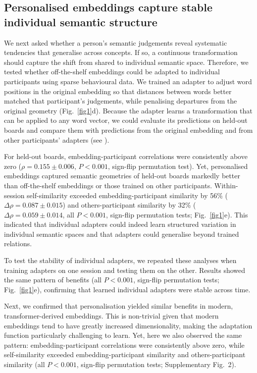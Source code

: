 \documentclass[pdflatex,sn-mathphys]{sn-jnl}
\begin{document}
\subsection{Personalised embeddings capture stable individual semantic structure}
We next asked whether a person's semantic judgements reveal systematic tendencies that generalise across concepts. If so, a continuous transformation should capture the shift from shared to individual semantic space. Therefore, we tested whether off-the-shelf embeddings could be adapted to individual participants using sparse behavioural data. We trained an adapter to adjust word positions in the original embedding so that distances between words better matched that participant's judgements, while penalising departures from the original geometry (Fig.~\ref{fig1}d). Because the adapter learns a transformation that can be applied to any word vector, we could evaluate its predictions on held-out boards and compare them with predictions from the original embedding and from other participants' adapters (see ).

For held-out boards, embedding-participant correlations were consistently above zero ($\rho = 0.155\pm0.006$, $P < 0.001$, sign-flip permutation test). Yet, personalised embeddings captured semantic geometries of held-out boards markedly better than off-the-shelf embeddings or those trained on other participants. Within-session self-similarity exceeded embedding-participant similarity by 56\% ($\Delta\rho = 0.087\pm0.015$) and others-participant similarity by 32\% ($\Delta\rho = 0.059\pm0.014$, all $P < 0.001$, sign-flip permutation tests; Fig.~\ref{fig1}e). This indicated that individual adapters could indeed learn structured variation in individual semantic spaces and that adapters could generalise beyond trained relations. 

To test the stability of individual adapters, we repeated these analyses when training adapters on one session and testing them on the other. Results showed the same pattern of benefits (all $P < 0.001$, sign-flip permutation tests; Fig.~\ref{fig1}e), confirming that learned individual adapters were stable across time.

Next, we confirmed that personalisation yielded similar benefits in modern, transformer-derived embeddings. This is non-trivial given that modern embeddings tend to have greatly increased dimensionality, making the adaptation function particularly challenging to learn. Yet, here we also observed the same pattern: embedding-participant correlations were consistently above zero, while self-similarity exceeded embedding-participant similarity and others-participant similarity (all $P < 0.001$, sign-flip permutation tests; Supplementary Fig.~2). 
\end{document}

